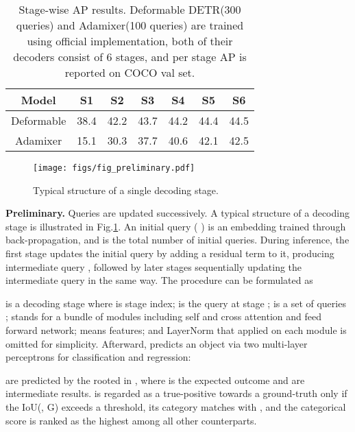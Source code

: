 \documentclass[10pt,twocolumn,letterpaper]{article}
\begin{document}
\begin{table}[]
    \centering
    \begin{tabular}{c|c|c|c|c|c|c}
        \toprule[1pt]
        Model & S1 & S2 & S3 & S4 & S5 & S6 \\ \midrule
        Deformable & 38.4 & 42.2 & 43.7 & 44.2 &44.4 & 44.5 \\ 
        Adamixer & 15.1  & 30.3 &37.7 &40.6&42.1&42.5 \\ 
        \bottomrule
    \end{tabular}
    \caption{Stage-wise AP results. Deformable DETR(300 queries) and Adamixer(100 queries) are trained using official implementation, both of their decoders consist of 6 stages, and per stage AP is reported on COCO val set.}
    \label{tab:stagewise_map}
\end{table}

\begin{figure}
    \centering
    \texttt{[image: figs/fig\_preliminary.pdf]}
    \caption{Typical structure of a single decoding stage.}
    \label{fig:preliminary}
\end{figure}

\textbf{Preliminary.} Queries are updated successively. A typical structure of a decoding stage is illustrated in Fig.\ref{fig:preliminary}. An initial query  ( ) is an embedding trained through back-propagation, and  is the total number of initial queries. During inference, the first stage updates the initial query by adding a residual term to it, producing intermediate query , followed by later stages sequentially updating the intermediate query in the same way. The procedure can be formulated as 


\noindent  is a decoding stage where  is stage index;  is the  query at stage ;  is a set of queries ;  stands for a bundle of modules including self and cross attention and feed forward network;  means features; and LayerNorm \cite{Ba2016LayerN} that applied on each module is omitted for simplicity. Afterward,  predicts an object  via two multi-layer perceptrons for classification and regression: 



\noindent  are predicted by the  rooted in , where  is the expected outcome and  are intermediate results.
 is regarded as a true-positive towards a ground-truth  only if the IoU(, G) exceeds a threshold, its category matches with , and the categorical score is ranked as the highest among all other counterparts.
\end{document}

